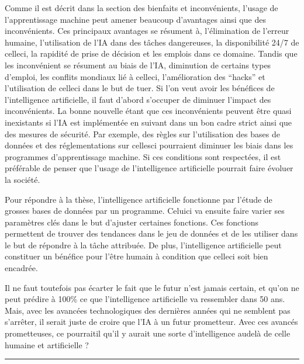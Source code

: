 \documentclass[letterpaper,10pt,french]{sphinxmanual}
\begin{document}
Comme il est décrit dans la section des bienfaits et inconvénients, l’usage
de l’apprentissage machine peut amener beaucoup d’avantages ainsi que des
inconvénients. Ces principaux avantages se résument à,
l’élimination de l’erreur humaine, l’utilisation de l’IA dans des tâches
dangereuses, la disponibilité 24/7 de celle\sphinxhyphen{}ci, la rapidité de prise de
décision et les emplois dans ce domaine. Tandis que les inconvénient se
résument au biais de l’IA, diminution de certains types d’emploi, les conflits
mondiaux lié à celle\sphinxhyphen{}ci, l’amélioration des “hacks” et l’utilisation de
celle\sphinxhyphen{}ci dans le but de tuer. Si l’on veut avoir les bénéfices de l’intelligence
artificielle, il faut d’abord s’occuper de diminuer l’impact des inconvénients.
La bonne nouvelle étant que ces inconvénients peuvent être quasi inexistants
si l’IA est implémentée en suivant dans un bon cadre strict ainsi que des
mesures de sécurité. Par exemple, des règles sur l’utilisation des bases
de données et des réglementations sur celles\sphinxhyphen{}ci pourraient diminuer les
biais dans les programmes d’apprentissage machine. Si ces conditions sont
respectées, il est préférable de penser que l’usage de l’intelligence
artificielle pourrait faire évoluer la société.

Pour répondre à la thèse, l’intelligence artificielle fonctionne par l’étude
de grosses bases de données par un programme. Celui\sphinxhyphen{}ci va ensuite faire
varier ses paramètres clés dans le but d’ajuster certaines fonctions. Ces
fonctions permettent de trouver des tendances dans le jeu de données et de
les utiliser dans le but de répondre à la tâche attribuée. De plus,
l’intelligence artificielle peut constituer un bénéfice pour l’être humain
à condition que celle\sphinxhyphen{}ci soit bien encadrée.

Il ne faut toutefois pas écarter le fait que le futur n’est jamais certain,
et qu’on ne peut prédire à 100\% ce que l’intelligence artificielle va
ressembler dans 50 ans. Mais, avec les avancées technologiques des dernières
années qui ne semblent pas s’arrêter, il serait juste de croire que l’IA
à un futur prometteur. Avec ces avancés prometteuses, ce pourrait\sphinxhyphen{}il qu’il
y aurait une sorte d’intelligence au\sphinxhyphen{}delà de celle humaine et artificielle ?


\bigskip\hrule\bigskip
\end{document}

